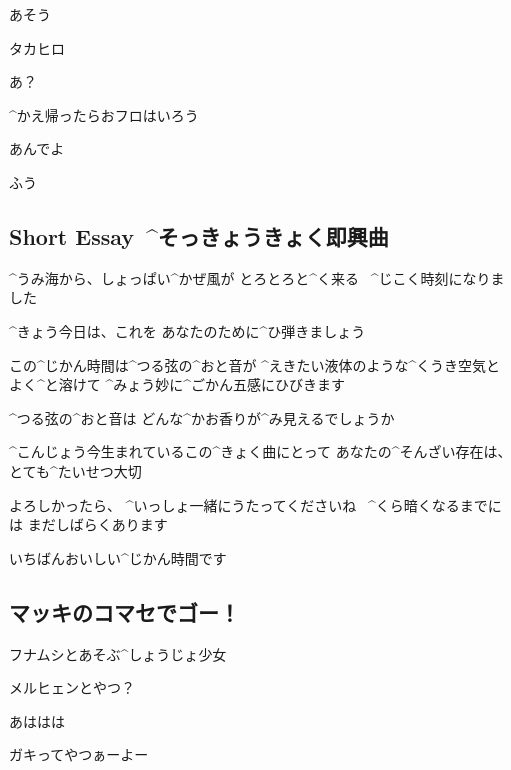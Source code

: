 \Takahiro あそう

\page[126]
\Makki タカヒロ

\Takahiro あ？

\Makki ^{かえ}{帰}ったらおフロはいろう

\Takahiro あんでよ

\Alpha ふう


\subsection{Short Essay\ ^{そっきょうきょく}{即興曲}}

\page[127]
\Alpha ^{うみ}{海}から、しょっぱい^{かぜ}{風}が
とろとろと^{く}{来}る
\ ^{じこく}{時刻}になりました

\Alpha ^{きょう}{今日}は、これを
あなたのために^{ひ}{弾}きましょう

\page[128]
\Alpha この^{じかん}{時間}は^{つる}{弦}の^{おと}{音}が
^{えきたい}{液体}のような^{くうき}{空気}とよく^{と}{溶}けて
^{みょう}{妙}に^{ごかん}{五感}にひびきます

\page[129]
\Alpha ^{つる}{弦}の^{おと}{音}は
どんな^{かお}{香}りが^{み}{見}えるでしょうか

\Alpha ^{こんじょう}{今生}まれているこの^{きょく}{曲}にとって
あなたの^{そんざい}{存在}は、とても^{たいせつ}{大切}

\page[130]
\Alpha よろしかったら、
^{いっしょ}{一緒}にうたってくださいね
\ ^{くら}{暗}くなるまでには
まだしばらくあります

\Alpha いちばんおいしい^{じかん}{時間}です


\subsection{マッキのコマセでゴー！}
\Ayase フナムシとあそぶ^{しょうじょ}{少女}

\Ayase メルヒェンとやつ？

\Makki あははは

\Ayase ガキってやつぁーよー
